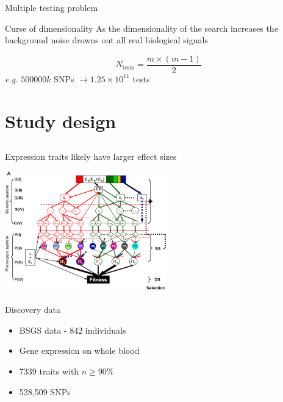 \documentclass{beamer}
\begin{document}
\begin{frame}{Multiple testing problem}
	\begin{block}{Curse of dimensionality}
		As the dimensionality of the search increases the background noise drowns out all real biological signals
	\end{block}

	\begin{equation}
		N_{\textrm{tests}} = \frac{m \times (m - 1)}{2} \nonumber
	\end{equation}
	\emph{e.g.} $500000k$ SNPs $\rightarrow 1.25 \times 10^{11}$ tests
\end{frame}


\section{Study design}
\subsection{}


\begin{frame}{Expression traits likely have larger effect sizes}
	\begin{center}
		\includegraphics[width=7cm]{broadgp}
	\end{center}
\end{frame}


\begin{frame}{Discovery data}
	\begin{itemize}
		\item BSGS data - 842 individuals
		\item Gene expression on whole blood
		\item 7339 traits with $n \geq 90\%$
		\item 528,509 SNPs
	\end{itemize}
\end{frame}
\end{document}
